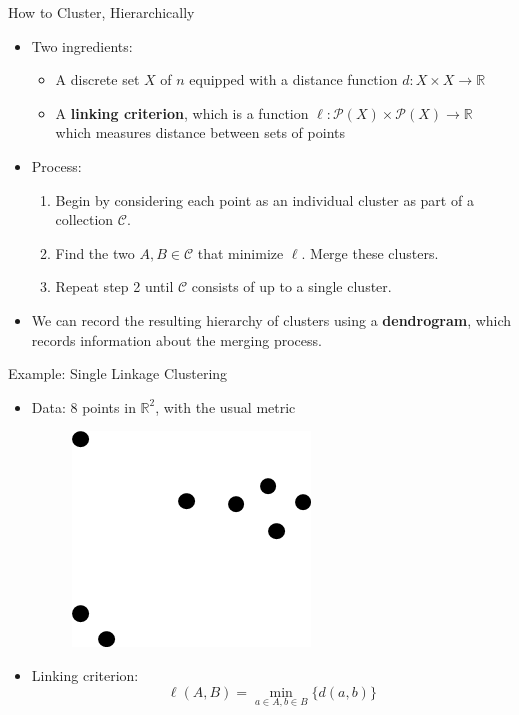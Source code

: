 \documentclass{beamer}
\begin{document}
\begin{frame}{How to Cluster, Hierarchically}
  \begin{itemize}
    \item Two ingredients:
    \begin{itemize}
      \item A discrete set $X$ of $n$ equipped with a distance function $d:X\times X\to\mathbb{R}$
      \item A \textbf{linking criterion}, which is a function $\ell: \mathscr{P}(X)\times\mathscr{P}(X)\to\mathbb{R}$ which measures distance between sets of points
    \end{itemize}
    \item Process:
    \begin{enumerate}
      \item Begin by considering each point as an individual cluster as part of a collection $\mathcal{C}$.
      \item Find the two $A,B\in\mathcal{C}$ that minimize $\ell$. Merge these clusters.
      \item Repeat step 2 until $\mathcal{C}$ consists of up to a single cluster.
    \end{enumerate}
    \item We can record the resulting hierarchy of clusters using a \textbf{dendrogram}, which records information about the merging process.
  \end{itemize}
\end{frame}

\begin{frame}{Example: Single Linkage Clustering}
  \begin{itemize}
    \item Data: 8 points in $\mathbb{R}^2$, with the usual metric
    \vspace*{.5cm}
    \begin{figure}
      \begin{center}
        \includegraphics[width=.4\textwidth]{cluster0.png}
      \end{center}
    \end{figure}
    \vspace*{.5cm}
    \item Linking criterion: $$\ell(A, B) = \min_{a\in A, b\in B}\{d(a,b)\}$$
  \end{itemize}
\end{frame}
\end{document}
